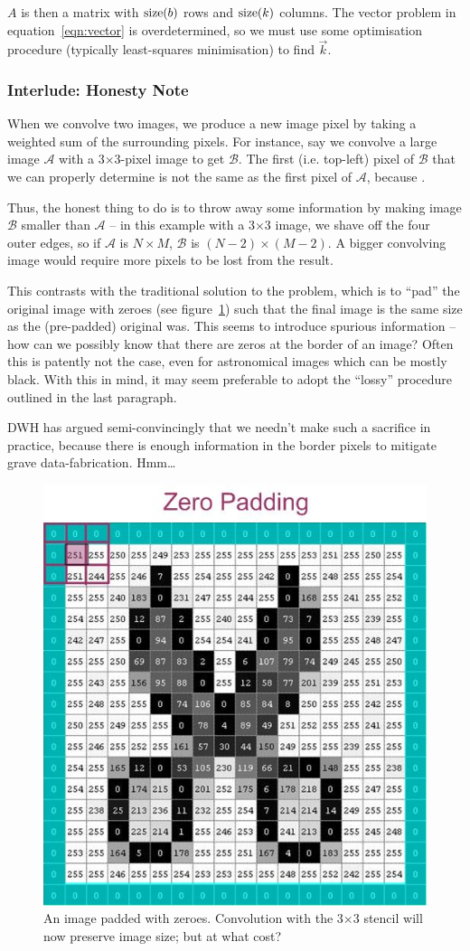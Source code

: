 \documentclass[letterpaper, 11pt]{article}
\def\MORE{{\color{red}{\bf MORE}}\xspace}
\begin{document}
\MORE

$A$ is then a matrix with ${\rm size}(b)$ rows and ${\rm size}(k)$ columns. The vector problem in equation~\ref{eqn:vector} is overdetermined, so we must use some optimisation procedure (typically least-squares minimisation) to find $\vec k$.


\subsubsection{Interlude: Honesty Note}
\label{sec:shave}

When we convolve two images, we produce a new image pixel by taking a weighted sum of the surrounding pixels. For instance, say we convolve a large image $\mathcal{A}$ with a 3$\times$3-pixel image to get $\mathcal{B}$. The first (i.e. top-left) pixel of $\mathcal{B}$ that we can properly determine is not the same as the first pixel of $\mathcal{A}$, because \MORE.

Thus, the honest thing to do is to throw away some information by making image $\mathcal B$ smaller than $\mathcal A$ -- in this example with a 3$\times$3 image, we shave off the four outer edges, so if $\mathcal A$ is $N\times M$, $\mathcal B$ is $(N-2)\times(M-2)$. A bigger convolving image would require more pixels to be lost from the result.

This contrasts with the traditional solution to the problem, which is to ``pad'' the original image with zeroes (see figure~\ref{fig:zeropad}) such that the final image is the same size as the (pre-padded) original was. This seems to introduce spurious information -- how can we possibly know that there are zeros at the border of an image? Often this is patently not the case, even for astronomical images which can be mostly black. With this in mind, it may seem preferable to adopt the ``lossy'' procedure outlined in the last paragraph.

DWH has argued semi-convincingly that we needn't make such a sacrifice in practice, because there is enough information in the border pixels to mitigate grave data-fabrication. Hmm\ldots

\begin{figure}[h]\label{fig:zeropad}
	\centering
	\includegraphics[width=0.33\linewidth]{Images/pad_zero_color.jpg}
	\caption{An image padded with zeroes. Convolution with the 3$\times$3 stencil will now preserve image size; but at what cost?}
\end{figure}
\end{document}

